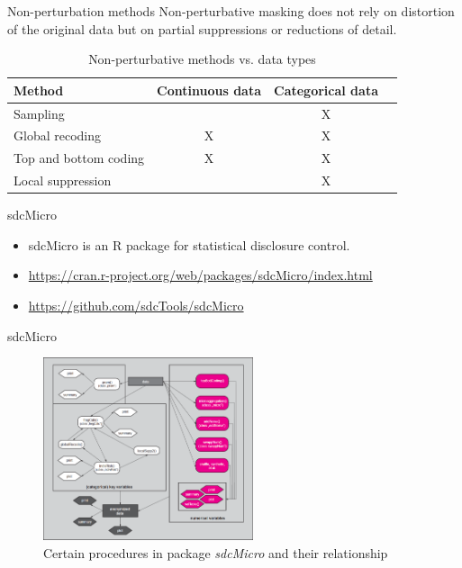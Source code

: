 \documentclass[
  ignorenonframetext,
  aspectratio=169,
]{beamer}
\begin{document}
\begin{frame}{Non-perturbation methods}
\label{non-perturbation-methods}
Non-perturbative masking does not rely on distortion of the original
data but on partial suppressions or reductions of detail.

\begin{table}[ht]   
\centering  
\begin{tabular}[t]{lccc}    
\toprule    
 Method & Continuous data & Categorical data&\\ 
\midrule    
 Sampling  & & X &\\    
 Global recoding & X & X &\\    
 Top and bottom coding& X & X &\\   
 Local suppression & & X &\\    
\bottomrule 
\end{tabular}   
\caption{Non-perturbative methods vs. data types}   
\end{table}
\end{frame}

\begin{frame}{sdcMicro}
\label{sdcmicro}
\begin{itemize}
\item
  sdcMicro is an R package for statistical disclosure control.
\item
  \url{https://cran.r-project.org/web/packages/sdcMicro/index.html}
\item
  \url{https://github.com/sdcTools/sdcMicro}
\end{itemize}
\end{frame}

\begin{frame}{sdcMicro}
\label{sdcmicro-1}
\begin{figure}[H]

{\centering \includegraphics[width=0.55\textwidth,height=\textheight]{gallery/sdcMicro.png}

}

\caption{Certain procedures in package \emph{sdcMicro} and their
relationship}

\end{figure}%
\end{frame}
\end{document}

